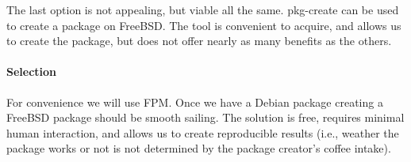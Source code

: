 The last option is not appealing, but viable all the same.
pkg-create can be used to create a package on FreeBSD.
The tool is convenient to acquire, and allows us to create the package, but does not offer nearly as many benefits as the others.

\paragraph{Selection}

For convenience we will use FPM.
Once we have a Debian package creating a FreeBSD package should be smooth sailing.
The solution is free, requires minimal human interaction, and allows us to create reproducible results (i.e., weather the package works or not is not determined by the package creator's coffee intake).
